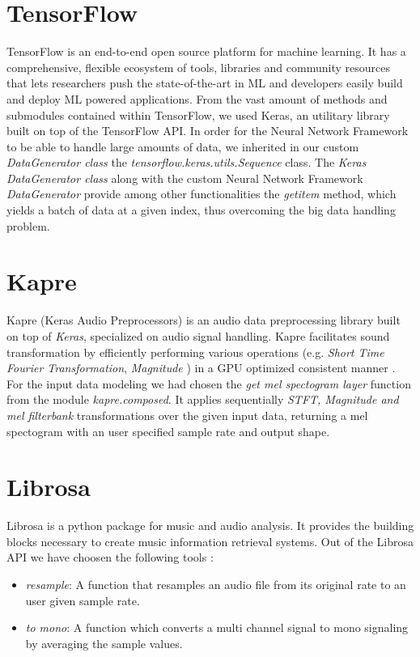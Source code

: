 \section{TensorFlow}
TensorFlow is an end-to-end open source platform for machine learning. It has a comprehensive, flexible ecosystem of tools, libraries and community resources that lets researchers push the state-of-the-art in ML and developers easily build and deploy ML powered applications.\cite{tf}
From the vast amount of methods and submodules contained within TensorFlow, we used Keras, an utilitary library
built on top of the TensorFlow API. In order for the Neural Network Framework to be able to handle large amounts
of data, we inherited in our custom \textit{DataGenerator class} the \textit{tensorflow.keras.utils.Sequence}
class. The \textit{Keras DataGenerator class} along with the custom Neural Network Framework \textit{DataGenerator}
provide among other functionalities the \textit{ getitem} method, which yields a batch of data at a given index, thus overcoming the big data handling problem.

\section{Kapre}
Kapre (Keras Audio Preprocessors) is an audio data preprocessing library built on top of \textit{Keras},
specialized on audio signal handling.\cite{choi2017kapre}
Kapre facilitates sound transformation by efficiently performing various operations (e.g. \textit{Short
Time Fourier Transformation}, \textit{Magnitude} ) in a GPU optimized consistent manner . For the input data modeling we had chosen the
\textit{get mel spectogram layer} function from the module \textit{kapre.composed}. It applies sequentially
\textit{STFT, Magnitude and mel filterbank} transformations over the given input data, returning a mel spectogram
with an user specified sample rate and output shape.
\section{Librosa}
Librosa is a python package for music and audio analysis. It provides the building blocks necessary to create music information retrieval systems. \cite{mcfee2015librosa}
Out of the Librosa API we have choosen the following tools :
\begin{itemize}
	\item \textit{resample}: A function that resamples an audio file from its original rate to an user
		given sample rate.

	\item \textit{to mono}: A function which converts a multi channel signal to mono signaling by averaging
		the sample values.
\end{itemize}
